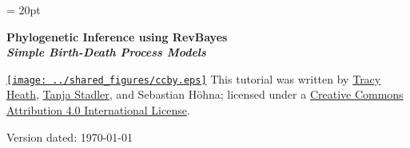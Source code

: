 \documentclass[11pt]{article}
\begin{document}
\renewcommand{\headrulewidth}{0.5pt}
\headsep = 20pt
\lhead{ }

\thispagestyle{plain}
\begin{center}

\textbf{\LARGE Phylogenetic Inference using RevBayes}\\\vspace{2mm}
\textbf{\it{\Large Simple Birth-Death Process Models}}\\\vspace{2mm}
\end{center}



\href{http://creativecommons.org/licenses/by/4.0/}{\texttt{[image: ../shared\_figures/ccby.eps]}} This tutorial was written by \href{http://phyloworks.org/}{Tracy Heath}, \href{http://www.bsse.ethz.ch/cevo}{Tanja Stadler}, and Sebastian H\"{o}hna; licensed under a \href{http://creativecommons.org/licenses/by/4.0/}{Creative Commons Attribution 4.0 International License}. 



Version dated: \today



\printbibliography[heading=relevref]
\end{document}
